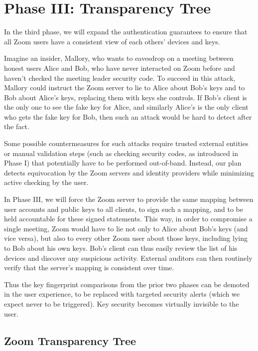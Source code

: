 \section{Phase III: Transparency Tree}

In the third phase, we will expand the authentication guarantees to ensure that all Zoom users have a consistent view of each others' devices and keys.

Imagine an insider, Mallory, who wants to eavesdrop on a meeting between honest users Alice and Bob, who have never interacted on Zoom before and haven't checked the meeting leader security code. To succeed in this attack, Mallory could instruct the Zoom server to lie to Alice about Bob's keys and to Bob about Alice's keys, replacing them with keys she controls. If Bob's client is the only one to see the fake key for Alice, and similarly Alice's is the only client who gets the fake key for Bob, then such an attack would be hard to detect after the fact.

Some possible countermeasures for such attacks require trusted external entities or manual validation steps (such as checking security codes, as introduced in Phase I) that potentially have to be performed out-of-band. Instead, our plan detects equivocation by the Zoom servers and identity providers while minimizing active checking by the user.

In Phase III, we will force the Zoom server to provide the same mapping between user accounts and public keys to all clients, to sign such a mapping, and to be held accountable for these signed statements. This way, in order to compromise a single meeting, Zoom would have to lie not only to Alice about Bob's keys (and vice versa), but also to every other Zoom user about those keys, including lying to Bob about his own keys. Bob's client can thus easily review the list of his devices and discover any suspicious activity. External auditors can then routinely verify that the server's mapping is consistent over time.

Thus the key fingerprint comparisons from the prior two phases can be demoted in the user experience, to be replaced with targeted security alerts (which we expect never to be triggered). Key security becomes virtually invisible to the user.

\subsection{Zoom Transparency Tree}

